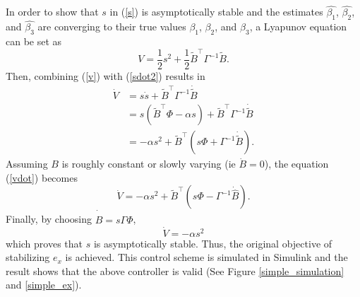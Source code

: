 In order to show that $s$ in (\ref{s}) is asymptotically stable and the estimates $\hat{\beta_1}$, $\hat{\beta_2}$, and $\hat{\beta_3}$ are converging to their true values $\beta_1$, $\beta_2$, and $\beta_3$, a Lyapunov equation can be set as
\begin{equation}
V=\frac{1}{2}s^2+\frac{1}{2}\tilde{B}^\top \Gamma^{-1}\tilde{B}.
\label{v}
\end{equation}
Then, combining (\ref{v}) with (\ref{sdot2}) results in
\begin{align}
\dot{V}&=s\dot{s}+\tilde{B}^\top \Gamma^{-1}\dot{\tilde{B}}
\\&=s(\tilde{B}^\top\Phi-\alpha s)+\tilde{B}^\top \Gamma^{-1}\dot{\tilde{B}}
\\&=-\alpha s^2+\tilde{B}^\top(s\Phi+\Gamma^{-1}\dot{\tilde{B}}).
\label{vdot}
\end{align}
Assuming $B$ is roughly constant or slowly varying (ie $\dot{B}=0$), the equation (\ref{vdot}) becomes 
\begin{equation}
\dot{V}=-\alpha s^2+\tilde{B}^\top(s\Phi-\Gamma^{-1}\dot{\hat{B}}).
\end{equation}
Finally, by choosing $\dot{\hat{B}}=s\Gamma\Phi$, 
\begin{equation}
\dot{V}=-\alpha s^2
\end{equation}
which proves that $s$ is asymptotically stable. Thus, the original objective of stabilizing $e_x$ is achieved. This control scheme is simulated in Simulink and the result shows that the above controller is valid (See Figure \ref{simple_simulation} and \ref{simple_ex}).
